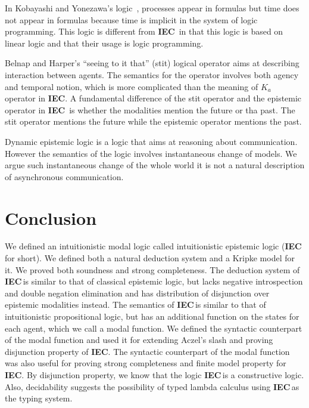 \documentclass[doctor]{iscs-thesis}
\newcommand{\iec}{{\rm {\textbf{IEC}}}}
\begin{document}
In Kobayashi and Yonezawa's logic~\cite{kobayashi1995asynchronous}, processes
appear in formulas but time does not appear in formulas
because time is implicit in the system of logic programming.
This logic is different from \iec\, in that this logic is based on linear logic and that their
usage is logic programming.

Belnap and Harper's ``seeing to it that'' (stit) logical operator
aims at describing interaction between agents.
The semantics for the operator involves both agency and temporal notion, which is more
complicated than the meaning of $K_a$ operator in \iec.
A fundamental difference of the stit operator and the epistemic operator in \iec\,
is whether the modalities mention the future or tha past.
The stit operator mentions the future while the epistemic operator mentions the past.

Dynamic epistemic logic is a logic that aims at reasoning about communication.
However the semantics of the logic involves
instantaneous change of models.
We argue such instantaneous change of the whole world it is
not a natural description of asynchronous communication.


\section{Conclusion}
\label{conclusion}

We defined an intuitionistic modal logic called intuitionistic epistemic logic (\iec\,for
short).
We defined both a natural deduction system and a Kripke model for it.
We proved both soundness and strong completeness.
The deduction system of \iec\,is similar to that of classical epistemic logic,
but lacks negative introspection and double negation elimination and has distribution of
disjunction over epistemic modalities instead.
The semantics of \iec\,is similar to that of intuitionistic propositional logic,
but has an additional function on the states for each agent, which we call a modal function.
We defined the syntactic counterpart of the modal function and used it for extending Aczel's
slash and proving disjunction property of \iec.  The syntactic counterpart of the modal
function was also useful for proving strong completeness and finite model property for
\iec.
By disjunction property, we know that the logic \iec\,is a constructive logic.
Also, decidability suggests the possibility of typed lambda calculus using \iec\,as the
typing system.
\end{document}
